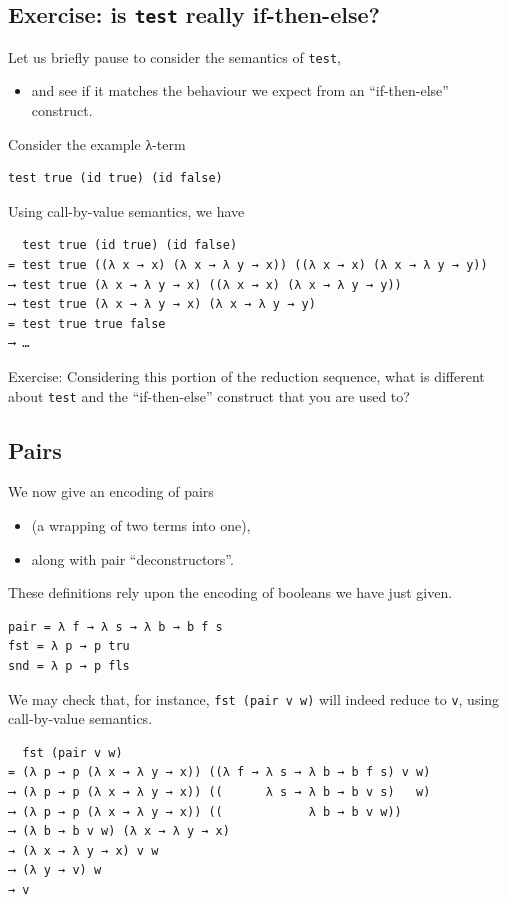 \documentclass[11pt]{article}
\theoremstyle{definition}
\begin{document}
\subsection{Exercise: is \texttt{test} really if-then-else?}
\label{sec:orgdf9d31e}

Let us briefly pause to consider the semantics of \texttt{test},
\begin{itemize}
\item and see if it matches the behaviour
we expect from an “if-then-else” construct.
\end{itemize}

Consider the example λ-term
\begin{verbatim}
test true (id true) (id false)
\end{verbatim}

Using call-by-value semantics, we have
\begin{verbatim}
  test true (id true) (id false)
= test true ((λ x → x) (λ x → λ y → x)) ((λ x → x) (λ x → λ y → y))
⟶ test true (λ x → λ y → x) ((λ x → x) (λ x → λ y → y))
⟶ test true (λ x → λ y → x) (λ x → λ y → y)
= test true true false
⟶ …
\end{verbatim}

Exercise: Considering this portion of the reduction sequence,
what is different about \texttt{test} and the “if-then-else” construct
that you are used to?

\subsection{Pairs}
\label{sec:orga0e777e}

We now give an encoding of pairs
\begin{itemize}
\item (a wrapping of two terms into one),
\item along with pair “deconstructors”.
\end{itemize}
These definitions rely upon the encoding of booleans
we have just given.

\begin{verbatim}
pair = λ f → λ s → λ b → b f s
fst = λ p → p tru
snd = λ p → p fls
\end{verbatim}

We may check that, for instance, \texttt{fst (pair v w)} will indeed
reduce to \texttt{v}, using call-by-value semantics.
\begin{verbatim}
  fst (pair v w)
= (λ p → p (λ x → λ y → x)) ((λ f → λ s → λ b → b f s) v w)
⟶ (λ p → p (λ x → λ y → x)) ((      λ s → λ b → b v s)   w)
⟶ (λ p → p (λ x → λ y → x)) ((            λ b → b v w))
⟶ (λ b → b v w) (λ x → λ y → x)
→ (λ x → λ y → x) v w
⟶ (λ y → v) w
→ v
\end{verbatim}
\end{document}
